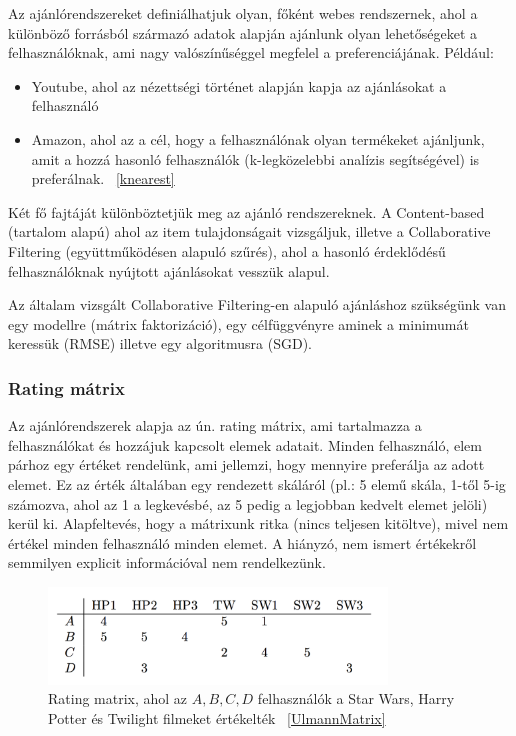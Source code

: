\documentclass[a4paper,12pt]{article}
\begin{document}
Az ajánlórendszereket definiálhatjuk olyan, főként webes rendszernek, ahol a különböző forrásból származó adatok alapján ajánlunk olyan lehetőségeket a felhasználóknak, ami nagy valószínűséggel megfelel a preferenciájának. Például:
\begin{itemize}
\item Youtube, ahol az nézettségi történet alapján kapja az ajánlásokat a felhasználó
\item Amazon, ahol az a cél, hogy a felhasználónak olyan termékeket ajánljunk, amit a hozzá hasonló felhasználók (k-legközelebbi analízis segítségével) is preferálnak. ~\ref{knearest}
\end{itemize}
Két fő fajtáját különböztetjük meg az ajánló rendszereknek. A Content-based (tartalom alapú) ahol az item tulajdonságait vizsgáljuk, illetve a Collaborative Filtering (együttműködésen alapuló szűrés), ahol a hasonló érdeklődésű felhasználóknak nyújtott ajánlásokat vesszük alapul. \linebreak

Az általam vizsgált Collaborative Filtering-en alapuló ajánláshoz szükségünk van egy modellre (mátrix faktorizáció), egy célfüggvényre aminek a minimumát keressük (RMSE) illetve egy algoritmusra (SGD).

\subsubsection{Rating mátrix}

Az ajánlórendszerek alapja az ún. rating mátrix, ami tartalmazza a felhasználókat és hozzájuk kapcsolt elemek adatait. Minden felhasználó, elem párhoz egy értéket rendelünk, ami jellemzi, hogy mennyire preferálja az adott elemet. Ez az érték általában egy rendezett skáláról (pl.: 5 elemű skála, 1-től 5-ig számozva, ahol az 1 a legkevésbé, az 5 pedig a legjobban kedvelt elemet jelöli) kerül ki. Alapfeltevés, hogy a mátrixunk ritka (nincs teljesen kitöltve), mivel nem értékel minden felhasználó minden elemet. A hiányzó, nem ismert értékekről semmilyen explicit információval nem rendelkezünk.

\begin{figure}[ht!]
\centering
\includegraphics[width=90mm]{img/um.png}
\caption{Rating matrix, ahol az $A,B, C, D$ felhasználók a Star Wars, Harry Potter és Twilight filmeket értékelték ~\ref{UlmannMatrix} \label{um}}
\end{figure}
\end{document}
